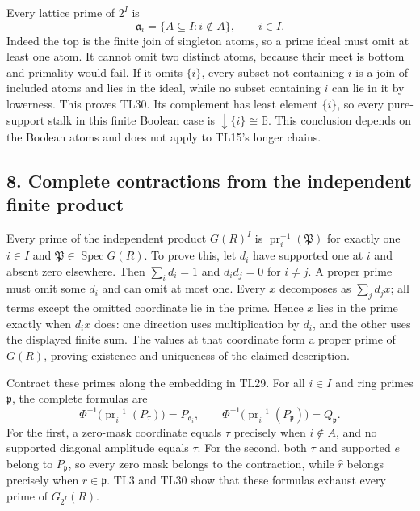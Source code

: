 Every lattice prime of \(2^I\) is \[
 \mathfrak a_i=\{A\subseteq I:i\notin A\},\qquad i\in I.
 \tag{TL30}
\] Indeed the top is the finite join of singleton atoms, so a prime
ideal must omit at least one atom. It cannot omit two distinct atoms,
because their meet is bottom and primality would fail. If it omits
\(\{i\}\), every subset not containing \(i\) is a join of included atoms
and lies in the ideal, while no subset containing \(i\) can lie in it by
lowerness. This proves TL30. Its complement has least element \(\{i\}\),
so every pure-support stalk in this finite Boolean case is
\(\downarrow\{i\}\cong\mathbb B\). This conclusion depends on the
Boolean atoms and does not apply to TL15's longer chains.

\subsection{8. Complete contractions from the independent finite
product}\label{complete-contractions-from-the-independent-finite-product}

Every prime of the independent product \(G(R)^I\) is
\(\operatorname{pr}_i^{-1}(\mathfrak P)\) for exactly one \(i\in I\) and
\(\mathfrak P\in\operatorname{Spec}G(R)\). To prove this, let \(d_i\)
have supported one at \(i\) and absent zero elsewhere. Then
\(\sum_i d_i=1\) and \(d_id_j=0\) for \(i\ne j\). A proper prime must
omit some \(d_i\) and can omit at most one. Every \(x\) decomposes as
\(\sum_jd_jx\); all terms except the omitted coordinate lie in the
prime. Hence \(x\) lies in the prime exactly when \(d_ix\) does: one
direction uses multiplication by \(d_i\), and the other uses the
displayed finite sum. The values at that coordinate form a proper prime
of \(G(R)\), proving existence and uniqueness of the claimed
description.

Contract these primes along the embedding in TL29. For all \(i\in I\)
and ring primes \(\mathfrak p\), the complete formulas are \[
 \boxed{\Phi^{-1}\bigl(\operatorname{pr}_i^{-1}(P_\tau)\bigr)=P_{\mathfrak a_i},\qquad
 \Phi^{-1}\bigl(\operatorname{pr}_i^{-1}(P_{\mathfrak p})\bigr)=Q_{\mathfrak p}.}
 \tag{TL31}
\] For the first, a zero-mask coordinate equals \(\tau\) precisely when
\(i\notin A\), and no supported diagonal amplitude equals \(\tau\). For
the second, both \(\tau\) and supported \(e\) belong to
\(P_{\mathfrak p}\), so every zero mask belongs to the contraction,
while \(\widehat r\) belongs precisely when \(r\in\mathfrak p\). TL3 and
TL30 show that these formulas exhaust every prime of \(G_{2^I}(R)\).

